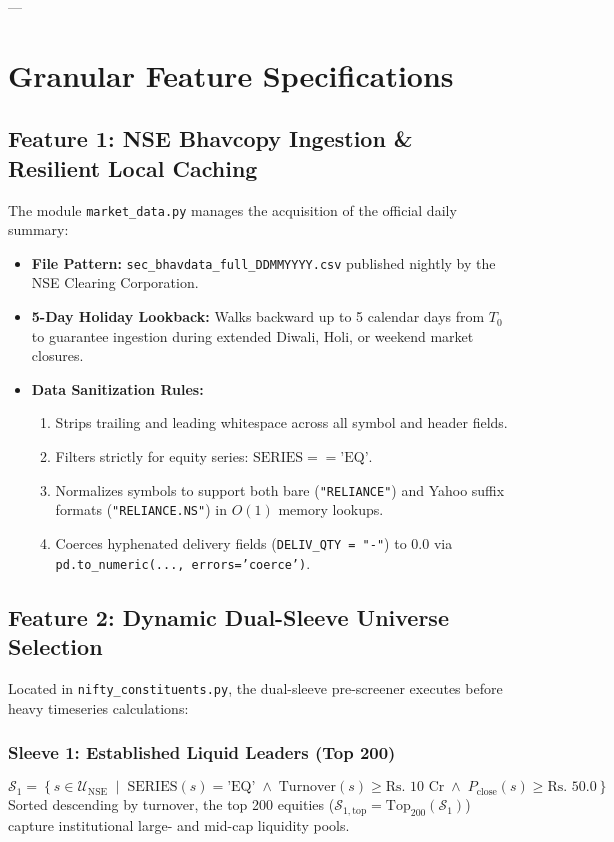 \documentclass[11pt,a4paper]{article}
\begin{document}
---

\section{Granular Feature Specifications}

\subsection{Feature 1: NSE Bhavcopy Ingestion \& Resilient Local Caching}
The module \texttt{market\_data.py} manages the acquisition of the official daily summary:
\begin{itemize}[leftmargin=*]
    \item \textbf{File Pattern:} \texttt{sec\_bhavdata\_full\_DDMMYYYY.csv} published nightly by the NSE Clearing Corporation.
    \item \textbf{5-Day Holiday Lookback:} Walks backward up to 5 calendar days from $T_0$ to guarantee ingestion during extended Diwali, Holi, or weekend market closures.
    \item \textbf{Data Sanitization Rules:}
    \begin{enumerate}
        \item Strips trailing and leading whitespace across all symbol and header fields.
        \item Filters strictly for equity series: $\text{SERIES} == \text{'EQ'}$.
        \item Normalizes symbols to support both bare (\texttt{"RELIANCE"}) and Yahoo suffix formats (\texttt{"RELIANCE.NS"}) in $O(1)$ memory lookups.
        \item Coerces hyphenated delivery fields (\texttt{DELIV\_QTY = "-"}) to $0.0$ via \texttt{pd.to\_numeric(..., errors='coerce')}.
    \end{enumerate}
\end{itemize}

\subsection{Feature 2: Dynamic Dual-Sleeve Universe Selection}
Located in \texttt{nifty\_constituents.py}, the dual-sleeve pre-screener executes before heavy timeseries calculations:

\subsubsection{Sleeve 1: Established Liquid Leaders (Top 200)}
\begin{equation}
\mathcal{S}_1 = \left\{ s \in \mathcal{U}_{\text{NSE}} \;\middle|\; \text{SERIES}(s) = \text{'EQ'} \;\land\; \text{Turnover}(s) \ge \text{Rs. } 10\text{ Cr} \;\land\; P_{\text{close}}(s) \ge \text{Rs. } 50.0 \right\}
\end{equation}
Sorted descending by turnover, the top 200 equities ($\mathcal{S}_{1, \text{top}} = \text{Top}_{200}(\mathcal{S}_1)$) capture institutional large- and mid-cap liquidity pools.
\end{document}
